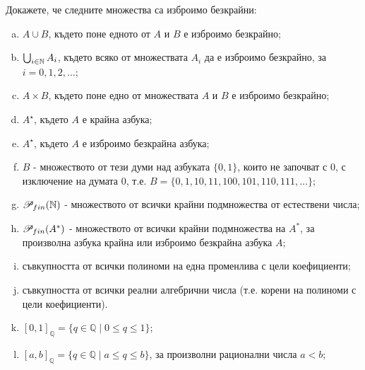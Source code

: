 \begin{problem}
  Докажете, че следните множества са изброимо безкрайни:
  \begin{enumerate}[a)]
  \item 
    $A \cup B$, където поне едното от $A$ и $B$ е изброимо безкрайно;
  \item
    $\bigcup_{i\in\mathbb{N}} A_i$, където всяко от множествата $A_i$ да е изброимо безкрайно, за $i = 0,1,2,\dots$;
  \item
    $A \times B$, където поне едно от множествата $A$ и $B$ е изброимо безкрайно;
  \item
    $A^\star$, където $A$ е крайна азбука;
  \item
    $A^\star$, където $A$ е изброимо безкрайна азбука;
  \item
    $B$ - множеството от тези думи над азбуката $\{0,1\}$, които не започват с $0$, с изключение на 
    думата $0$, т.е. $B = \{0, 1, 10, 11, 100, 101, 110, 111, \dots\}$;
  \item
    $\mathscr{P}_{fin}(\mathbb{N})$ - множеството от всички крайни подмножества от естествени числа;
  \item
    $\mathscr{P}_{fin}(A^*)$ - множеството от всички крайни подмножества на $A^*$, за произволна азбука 
    крайна или изброимо безкрайна азбука $A$;
  \item
    съвкупността от всички полиноми на една променлива с цели коефициенти;
  \item
    съвкупността от всички реални алгебрични числа (т.е. корени на полиноми с цели коефициенти).
  \item
    $[0,1]_{\mathbb{Q}} = \{q \in \mathbb{Q} \mid 0 \leq q \leq 1\}$;
  \item
    $[a,b]_{\mathbb{Q}} = \{q \in \mathbb{Q} \mid a \leq q \leq b\}$, за произволни рационални числа $a < b$;
  \end{enumerate}
\end{problem}
